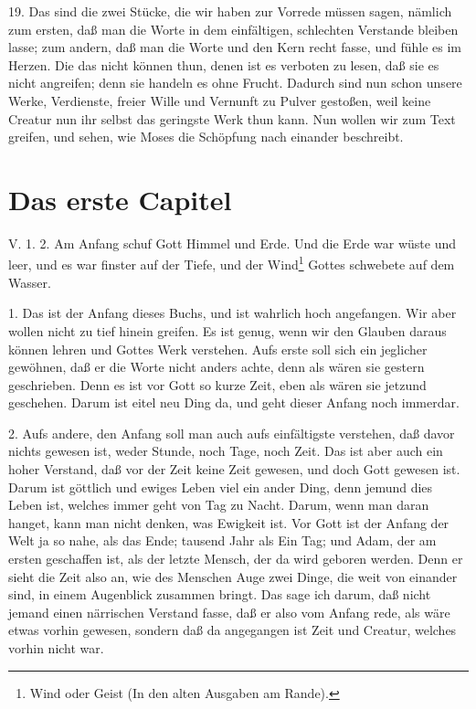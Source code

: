 19. Das sind die zwei Stücke, die wir haben zur Vorrede müssen sagen, nämlich zum ersten, daß man die Worte in dem einfältigen, schlechten Verstande bleiben lasse; zum andern, daß man die Worte und den Kern recht fasse, und fühle es im Herzen. Die das nicht können thun, denen ist es verboten zu lesen, daß sie es nicht angreifen; denn sie handeln es ohne Frucht. Dadurch sind nun schon unsere Werke, Verdienste, freier Wille und Vernunft zu Pulver gestoßen, weil keine Creatur nun ihr selbst das geringste Werk thun kann. Nun wollen wir zum Text greifen, und sehen, wie Moses die Schöpfung nach einander beschreibt.

\section{Das erste Capitel}

V. 1. 2. Am Anfang schuf Gott Himmel und Erde. Und die Erde war wüste und leer, und es war finster auf der Tiefe, und der Wind\footnote{Wind oder Geist (In den alten Ausgaben am Rande).} Gottes schwebete auf dem Wasser.

1. Das ist der Anfang dieses Buchs, und ist wahrlich hoch angefangen. Wir aber wollen nicht zu tief hinein greifen. Es ist genug, wenn wir den Glauben daraus können lehren und Gottes Werk verstehen. Aufs erste soll sich ein jeglicher gewöhnen, daß er die Worte nicht anders achte, denn als wären sie gestern geschrieben. Denn es ist vor Gott so kurze Zeit, eben als wären sie jetzund geschehen. Darum ist eitel neu Ding da, und geht dieser Anfang noch immerdar.

2. Aufs andere, den Anfang soll man auch aufs einfältigste verstehen, daß davor nichts gewesen ist, weder Stunde, noch Tage, noch Zeit. Das ist aber auch ein hoher Verstand, daß vor der Zeit keine Zeit gewesen, und doch Gott gewesen ist. Darum ist göttlich und ewiges Leben viel ein ander Ding, denn jemund dies Leben ist, welches immer geht von Tag zu Nacht. Darum, wenn man daran hanget, kann man nicht denken, was Ewigkeit ist. Vor Gott ist der Anfang der Welt ja so nahe, als das Ende; tausend Jahr als Ein Tag; und Adam, der am ersten geschaffen ist, als der letzte Mensch, der da wird geboren werden. Denn er sieht die Zeit also an, wie des Menschen Auge zwei Dinge, die weit von einander sind, in einem Augenblick zusammen bringt. Das sage ich darum, daß nicht jemand einen närrischen Verstand fasse, daß er also vom Anfang rede, als wäre etwas vorhin gewesen, sondern daß da angegangen ist Zeit und Creatur, welches vorhin nicht war.

